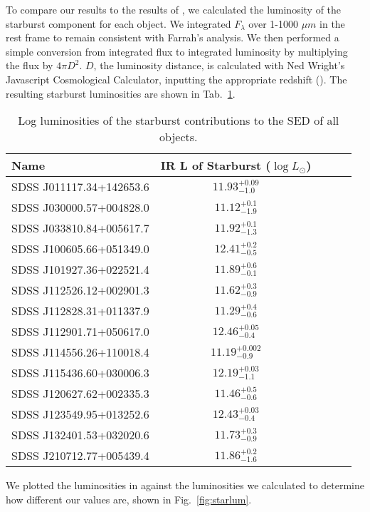To compare our results to the results of \cite{farrah2012}, we calculated the luminosity of the starburst 
component for each object. We integrated $F_{\lambda}$ over 1-1000 $\mu m$ in the rest frame to remain consistent 
with Farrah's analysis. We then performed a simple conversion from integrated flux to integrated luminosity by multiplying 
the flux by $4\pi D^2$. $D$, the luminosity distance, is calculated with Ned Wright's Javascript Cosmological Calculator, inputting the 
appropriate redshift (\citealp{wright2006}). The resulting starburst luminosities are shown in Tab.~\ref{tab:starlum}.

\begin{table}
  \centering
  \caption{Log luminosities of the starburst contributions to the SED of all objects.}
  \label{tab:starlum}
  \begin{tabular}{lcccr}
    \hline \hline
    Name & IR L of Starburst ($\log L_{\odot}$) \\
    
    \hline
    SDSS J011117.34+142653.6 & $11.93^{+0.09}_{-1.0}$ \\
    SDSS J030000.57+004828.0 & $11.12^{+0.1}_{-1.9}$ \\
    SDSS J033810.84+005617.7 & $11.92^{+0.1}_{-1.3}$ \\
    SDSS J100605.66+051349.0 & $12.41^{+0.2}_{-0.5}$ \\
    SDSS J101927.36+022521.4 & $11.89^{+0.6}_{-0.1}$ \\
    SDSS J112526.12+002901.3 & $11.62^{+0.3}_{-0.9}$ \\
    SDSS J112828.31+011337.9 & $11.29^{+0.4}_{-0.6}$ \\
    SDSS J112901.71+050617.0 & $12.46^{+0.05}_{-0.4}$ \\
    SDSS J114556.26+110018.4 & $11.19^{+0.002}_{-0.9}$ \\
    SDSS J115436.60+030006.3 & $12.19^{+0.03}_{-1.1}$ \\
    SDSS J120627.62+002335.3 & $11.46^{+0.5}_{-0.6}$ \\
    SDSS J123549.95+013252.6 & $12.43^{+0.03}_{-0.4}$ \\
    SDSS J132401.53+032020.6 & $11.73^{+0.3}_{-0.9}$ \\
    SDSS J210712.77+005439.4 & $11.86^{+0.2}_{-1.6}$ \\

  \end{tabular}
\end{table}

We plotted the luminosities in \cite{farrah2012} against the luminosities we calculated to determine how 
different our values are, shown in Fig.~\ref{fig:starlum}. 

